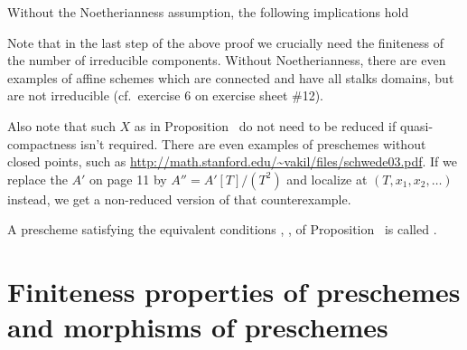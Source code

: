 \documentclass[a4paper,parskip=half,numbers=enddot, DIV=12]{scrreprt}
\begin{document}
\begin{rem}%
	Without the Noetherianness assumption, the following implications hold
	\begin{center}
	\end{center}
	Note that in the last step of the above proof we crucially need the finiteness of the number of irreducible components. Without Noetherianness, there are even examples of affine schemes which are connected and have all stalks domains, but are not irreducible (cf.\ exercise 6 on exercise sheet \#12).
	
	Also note that such $X$ as in Proposition~ do not need to be reduced if quasi-compactness isn't required. There are even examples of preschemes without closed points, such as \url{http://math.stanford.edu/~vakil/files/schwede03.pdf}. If we replace the $A'$ on page 11 by $A''=A'[T]/(T^2)$ and localize at $(T,x_1,x_2,\ldots)$ instead, we get a non-reduced version of that counterexample.
\end{rem}
\begin{defi}
    A prescheme satisfying the equivalent conditions , ,  of Proposition~ is called .
\end{defi}

\section{Finiteness properties of preschemes and morphisms of preschemes}
\end{document}
